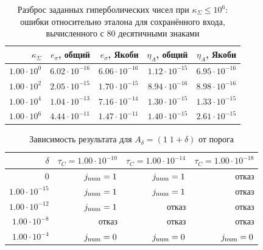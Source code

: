 \begin{table}[htbp]
\centering\small
\caption{Разброс заданных гиперболических чисел при $\kappa_\Sigma\le10^6$: ошибки относительно эталона для сохранённого входа, вычисленного с 80 десятичными знаками}
\label{tab:spectrum}
\begin{tabular}{@{}rrrrr@{}}
\toprule
$\kappa_\Sigma$ & $e_\sigma$, общий & $e_\sigma$, Якоби & $\eta_A$, общий & $\eta_A$, Якоби\\
\midrule
$1.00\cdot10^{0}$ & $6.02\cdot10^{-16}$ & $6.06\cdot10^{-16}$ & $1.12\cdot10^{-15}$ & $6.95\cdot10^{-16}$\\
$1.00\cdot10^{2}$ & $2.05\cdot10^{-15}$ & $1.70\cdot10^{-15}$ & $8.94\cdot10^{-16}$ & $8.98\cdot10^{-16}$\\
$1.00\cdot10^{4}$ & $1.04\cdot10^{-13}$ & $7.16\cdot10^{-14}$ & $1.30\cdot10^{-15}$ & $1.33\cdot10^{-15}$\\
$1.00\cdot10^{6}$ & $4.44\cdot10^{-11}$ & $1.47\cdot10^{-11}$ & $1.40\cdot10^{-15}$ & $2.61\cdot10^{-15}$\\
\bottomrule
\end{tabular}
\end{table}

\begin{table}[htbp]
\centering\small
\caption{Зависимость результата для $A_\delta=(1\;1+\delta)$ от порога}
\label{tab:threshold}
\begin{tabular}{@{}rrrr@{}}
\toprule
$\delta$ & $\tau_C=1.00\cdot10^{-10}$ & $\tau_C=1.00\cdot10^{-14}$ & $\tau_C=1.00\cdot10^{-18}$\\
\midrule
$0$ & $j_{\rm num}=1$ & $j_{\rm num}=1$ & отказ\\
$1.00\cdot10^{-15}$ & $j_{\rm num}=1$ & $j_{\rm num}=1$ & отказ\\
$1.00\cdot10^{-12}$ & $j_{\rm num}=1$ & отказ & отказ\\
$1.00\cdot10^{-8}$ & отказ & отказ & отказ\\
$1.00\cdot10^{-4}$ & $j_{\rm num}=0$ & $j_{\rm num}=0$ & $j_{\rm num}=0$\\
\bottomrule
\end{tabular}
\end{table}
